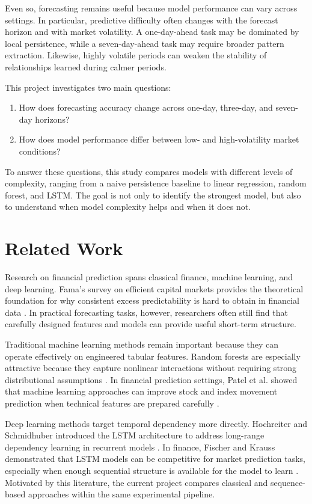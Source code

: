 \documentclass[conference]{IEEEtran}
\begin{document}
Even so, forecasting remains useful because model performance can vary across settings. In particular, predictive difficulty often changes with the forecast horizon and with market volatility. A one-day-ahead task may be dominated by local persistence, while a seven-day-ahead task may require broader pattern extraction. Likewise, highly volatile periods can weaken the stability of relationships learned during calmer periods.

This project investigates two main questions:
\begin{enumerate}
    \item How does forecasting accuracy change across one-day, three-day, and seven-day horizons?
    \item How does model performance differ between low- and high-volatility market conditions?
\end{enumerate}

To answer these questions, this study compares models with different levels of complexity, ranging from a naive persistence baseline to linear regression, random forest, and LSTM. The goal is not only to identify the strongest model, but also to understand when model complexity helps and when it does not.

\section{Related Work}
Research on financial prediction spans classical finance, machine learning, and deep learning. Fama's survey on efficient capital markets provides the theoretical foundation for why consistent excess predictability is hard to obtain in financial data \cite{fama1970efficient}. In practical forecasting tasks, however, researchers often still find that carefully designed features and models can provide useful short-term structure.

Traditional machine learning methods remain important because they can operate effectively on engineered tabular features. Random forests are especially attractive because they capture nonlinear interactions without requiring strong distributional assumptions \cite{breiman2001random}. In financial prediction settings, Patel et al. showed that machine learning approaches can improve stock and index movement prediction when technical features are prepared carefully \cite{patel2015stock}.

Deep learning methods target temporal dependency more directly. Hochreiter and Schmidhuber introduced the LSTM architecture to address long-range dependency learning in recurrent models \cite{hochreiter1997lstm}. In finance, Fischer and Krauss demonstrated that LSTM models can be competitive for market prediction tasks, especially when enough sequential structure is available for the model to learn \cite{fischer2018lstmfinance}. Motivated by this literature, the current project compares classical and sequence-based approaches within the same experimental pipeline.
\end{document}
